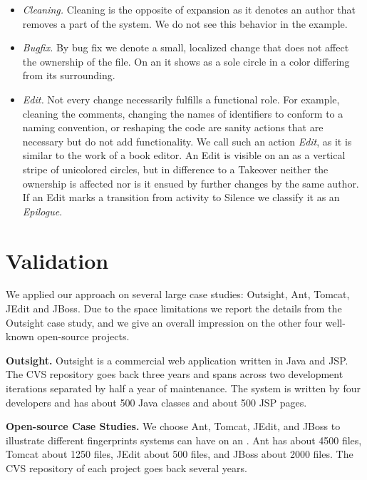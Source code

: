 \documentclass[10pt]{book}
\begin{document}
\begin{itemize}
\item \emph{Cleaning.} Cleaning is the opposite of expansion as it denotes an author that removes a part of the system. We do not see this behavior in the example.

\item \emph{Bugfix.} By bug fix we denote a small, localized change that does not affect the ownership of the file. On an \omap it shows as a sole circle in a color differing from its surrounding.

\item \emph{Edit.} Not every change necessarily fulfills a functional role. For example, cleaning the comments, changing the names of identifiers to conform to a naming convention, or reshaping the code are sanity actions that are necessary but do not add functionality. We call such an action \emph{Edit}, as it is similar to the work of a book editor. An Edit is visible on an \omap as a vertical stripe of unicolored circles, but in difference to a Takeover neither the ownership is affected nor is it ensued by further changes by the same author. If an Edit marks a transition from activity to Silence we classify it as an \emph{Epilogue}.

\end{itemize}

\section{Validation}\label{sec:validation}

We applied our approach on several large case studies: Outsight, Ant, Tomcat, JEdit and JBoss. Due to the space limitations we report the details from the Outsight case study, and we give an overall impression on the other four well-known open-source projects.

\textbf{Outsight.} Outsight is a commercial web application written in Java and JSP. The CVS repository goes back three years and spans across two development iterations separated by half a year of maintenance. The system is written by four developers and has about 500 Java classes and about 500 JSP pages.

\textbf{Open-source Case Studies.} We choose Ant, Tomcat, JEdit, and JBoss to illustrate different fingerprints systems can have on an \omap. Ant has about 4500 files, Tomcat about 1250 files, JEdit about 500 files, and JBoss about 2000 files. The CVS repository of each project goes back several years.
\end{document}
